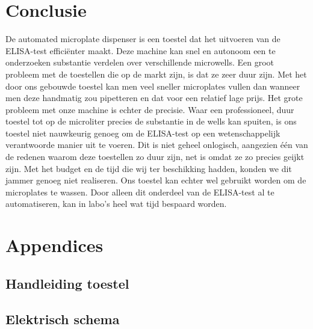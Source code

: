 \documentclass[a4paper,twoside,kulak]{kulakreport} %
\begin{document}


\chapter{Conclusie}

De automated microplate dispenser is een toestel dat het uitvoeren van de ELISA-test  efficiënter maakt. Deze machine kan snel en autonoom een te onderzoeken substantie verdelen over verschillende microwells. Een groot probleem met de toestellen die op de markt zijn, is dat ze zeer duur zijn. Met het door ons gebouwde toestel kan men veel sneller microplates vullen dan wanneer men deze handmatig zou pipetteren en dat voor een relatief lage prijs. Het grote probleem met onze machine is echter de precisie. Waar een professioneel, duur toestel tot op de microliter precies de substantie in de wells kan spuiten, is ons toestel niet nauwkeurig genoeg om de ELISA-test op een wetenschappelijk verantwoorde manier uit te voeren. Dit is niet geheel onlogisch, aangezien één van de redenen waarom deze toestellen zo duur zijn, net is omdat ze zo precies geijkt zijn. Met het budget en de tijd die wij ter beschikking hadden, konden we dit jammer genoeg niet realiseren. Ons toestel kan echter wel gebruikt worden om de microplates te wassen. Door alleen dit onderdeel van de ELISA-test al te automatiseren, kan in labo's heel wat tijd bespaard worden.

\clearpage
\nocite{wikipedia,LabX}



\chapter*{Appendices}

\section*{Handleiding toestel}



\section*{Elektrisch schema}
\label{Appendix: elektrisch schema}

\end{document}
